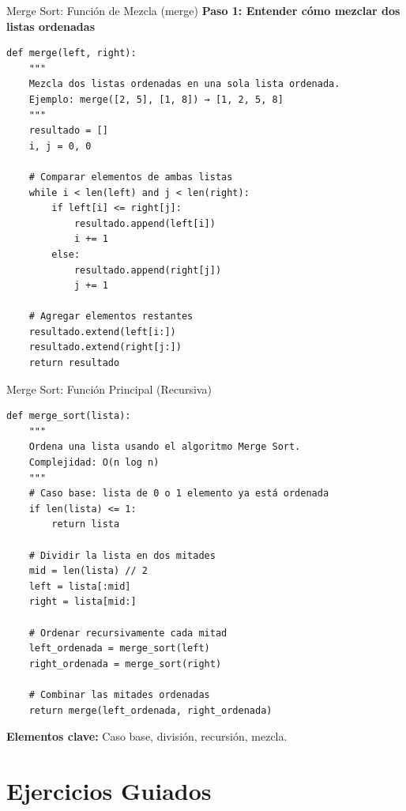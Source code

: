 \documentclass[10pt]{beamer}
\begin{document}
\begin{frame}[fragile]{Merge Sort: Función de Mezcla (merge)}
  \textbf{Paso 1: Entender cómo mezclar dos listas ordenadas}
  
\begin{verbatim}
def merge(left, right):
    """
    Mezcla dos listas ordenadas en una sola lista ordenada.
    Ejemplo: merge([2, 5], [1, 8]) → [1, 2, 5, 8]
    """
    resultado = []
    i, j = 0, 0
    
    # Comparar elementos de ambas listas
    while i < len(left) and j < len(right):
        if left[i] <= right[j]:
            resultado.append(left[i])
            i += 1
        else:
            resultado.append(right[j])
            j += 1
    
    # Agregar elementos restantes
    resultado.extend(left[i:])
    resultado.extend(right[j:])
    return resultado
\end{verbatim}
\end{frame}

\begin{frame}[fragile]{Merge Sort: Función Principal (Recursiva)}
\begin{verbatim}
def merge_sort(lista):
    """
    Ordena una lista usando el algoritmo Merge Sort.
    Complejidad: O(n log n)
    """
    # Caso base: lista de 0 o 1 elemento ya está ordenada
    if len(lista) <= 1:
        return lista
    
    # Dividir la lista en dos mitades
    mid = len(lista) // 2
    left = lista[:mid]
    right = lista[mid:]
    
    # Ordenar recursivamente cada mitad
    left_ordenada = merge_sort(left)
    right_ordenada = merge_sort(right)
    
    # Combinar las mitades ordenadas
    return merge(left_ordenada, right_ordenada)
\end{verbatim}

\textbf{Elementos clave:} Caso base, división, recursión, mezcla.
\end{frame}
\section{Ejercicios Guiados}
\end{document}
